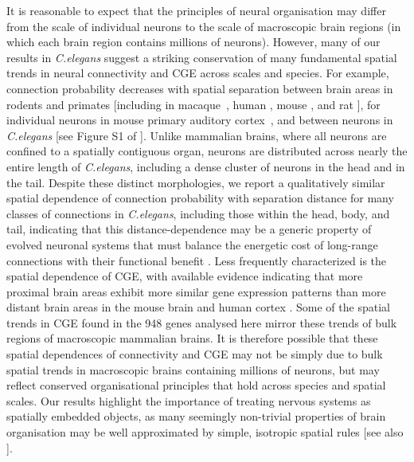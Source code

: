 {It is reasonable to expect that the principles of neural organisation may differ from the scale of individual neurons to the scale of macroscopic brain regions (in which each brain region contains millions of neurons).
However, many of our results in \emph{C.elegans} suggest a striking conservation of many fundamental spatial trends in neural connectivity and CGE across scales and species.
For example, connection probability decreases with spatial separation between brain areas in rodents and primates \citep{Horvat2016,Wang2016} [including in \mbox{macaque \citep{Markov2013}}, human \citep{Henderson2014}, mouse \citep{Fulcher2016}, and rat \mbox{\citep{Noori2017}}],
for individual neurons in mouse primary auditory \mbox{cortex \citep{Levy2012}},
and between neurons in \emph{C.elegans} [see Figure S1 of \citep{Azulay2016}].
Unlike mammalian brains, where all neurons are confined to a spatially contiguous organ, neurons are distributed across nearly the entire length of \emph{C.elegans}, including a dense cluster of neurons in the head and in the tail.
Despite these distinct morphologies, we report a qualitatively similar spatial dependence of connection probability with separation distance for many classes of connections in \emph{C.elegans}, including those within the head, body, and tail, indicating that this distance-dependence may be a generic property of evolved neuronal systems that must balance the energetic cost of long-range connections with their functional benefit \citep{Bullmore2012, VandenHeuvel2012, Kim2014a, Betzel2016}.
Less frequently characterized is the spatial dependence of CGE, with available evidence indicating that more proximal brain areas exhibit more similar gene expression patterns than more distant brain areas in the mouse brain \citep{Fulcher2016} and human cortex \citep{Krienen2016, Pantazatos2017, Richiardi2017}.
Some of the spatial trends in CGE found in the 948 genes analysed here mirror these trends of bulk regions of macroscopic mammalian brains.
It is therefore possible that these spatial dependences of connectivity and CGE may not be simply due to bulk spatial trends in macroscopic brains containing millions of neurons, but may reflect conserved organisational principles that hold across species and spatial scales.
Our results highlight the importance of treating nervous systems as spatially embedded objects, as many seemingly non-trivial properties of brain organisation may be well approximated by simple, isotropic spatial rules \citep{Henderson2014, Roberts2016, Horvat2016, Bassett2010, Chen2006} [see also \citep{Bullmore2012, Betzel2016}].

}
